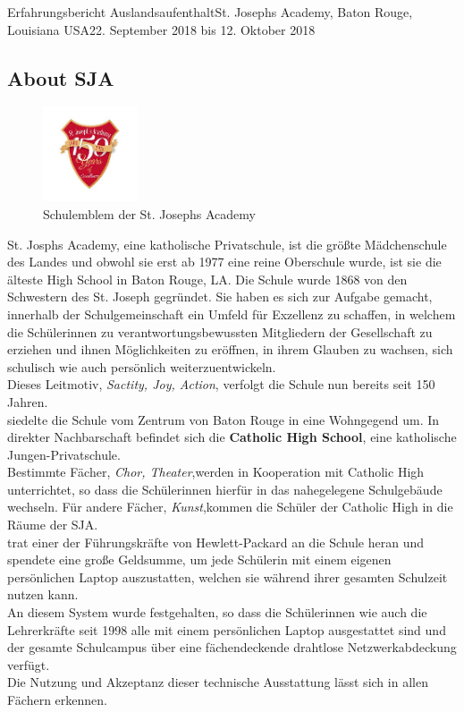 \documentclass[oneside,openany,headings=optiontotoc,11pt,numbers=noenddot]{article}
\begin{document}
\begin{worksheet}{Erfahrungsbericht Auslandsaufenthalt}{St. Joseph\grq{}s Academy, Baton Rouge, Louisiana USA}{22. September 2018 bis 12. Oktober 2018}
		\subsection{About SJA}
		\begin{figure}
			\centering
			\includegraphics[width=0.25\textwidth]{SJA.jpg}
			\caption{\label{fig:sja}Schulemblem der St. Joseph\grq{}s Academy}
		\end{figure}
		St. Josph\grq{}s Academy, eine katholische Privatschule, ist die größte Mädchenschule des Landes und obwohl sie erst ab 1977 eine reine Oberschule wurde, ist sie die älteste High School in Baton Rouge, LA. Die Schule wurde 1868 von den Schwestern des St. Joseph gegründet. Sie haben es sich zur Aufgabe gemacht, innerhalb der Schulgemeinschaft ein Umfeld für Exzellenz zu schaffen, in welchem die Schülerinnen zu verantwortungsbewussten Mitgliedern der Gesellschaft zu erziehen und ihnen Möglichkeiten zu eröffnen, in ihrem Glauben zu wachsen, sich schulisch wie auch persönlich weiterzuentwickeln.\\
		Dieses Leitmotiv, \textit{Sactity, Joy, Action}, verfolgt die Schule nun bereits seit 150 Jahren.\\
		
		 siedelte die Schule vom Zentrum von Baton Rouge in eine Wohngegend um. In direkter Nachbarschaft befindet sich die \textbf{Catholic High School}, eine katholische Jungen-Privatschule.\\
		Bestimmte Fächer, \small{\textit{Chor, Theater}},\normalsize werden in Kooperation mit Catholic High unterrichtet, so dass die Schülerinnen hierfür in das nahegelegene Schulgebäude wechseln. Für andere Fächer, \small{\textit{Kunst}},\normalsize  kommen die Schüler der Catholic High in die Räume der SJA.\\
		
		 trat einer der Führungskräfte von Hewlett-Packard an die Schule heran und spendete eine große Geldsumme, um jede Schülerin mit einem eigenen persönlichen Laptop auszustatten, welchen sie während ihrer gesamten Schulzeit nutzen kann.\\
		An diesem System wurde festgehalten, so dass die Schülerinnen wie auch die Lehrerkräfte seit 1998 alle mit einem persönlichen Laptop ausgestattet sind und der gesamte Schulcampus über eine fächendeckende drahtlose Netzwerkabdeckung verfügt.\\
		Die Nutzung und Akzeptanz dieser technische Ausstattung lässt sich in allen Fächern erkennen.\\
		

\end{worksheet}
\end{document}
